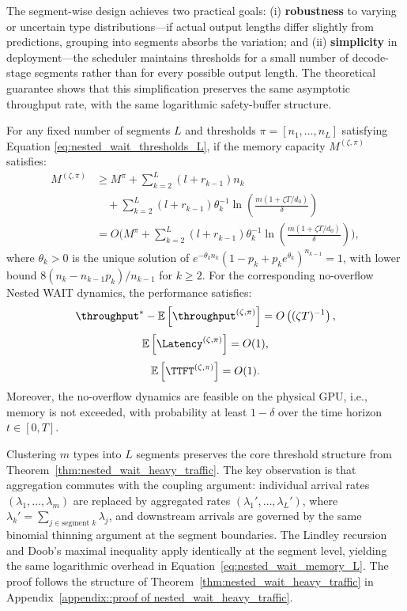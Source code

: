 The segment-wise design achieves two practical goals: (i) \textbf{robustness} to varying or uncertain type distributions---if actual output lengths differ slightly from predictions, grouping into segments absorbs the variation; and (ii) \textbf{simplicity} in deployment---the scheduler maintains thresholds for a small number of decode-stage segments rather than for every possible output length. The theoretical guarantee shows that this simplification preserves the same asymptotic throughput rate, with the same logarithmic safety-buffer structure.

\begin{theorem}
\label{thm:nested_wait_heavy_traffic, any segment}
For any fixed number of segments $L$ and thresholds $\pi = [n_1, \dots, n_L]$ satisfying Equation \eqref{eq:nested_wait_thresholds_L}, if the memory capacity $M^{(\zeta, \pi)}$ satisfies:
\begin{equation}
    \label{eq:nested_wait_memory_L}
    \begin{aligned}
M^{(\zeta, \pi)}
&\geq M^\pi
	+ \sum_{k=2}^L (l + r_{k-1}) n_k \\
&\quad
+ \sum_{k=2}^L (l + r_{k-1}) \theta_k^{-1}
\ln\left( \frac{m(1+\zeta T/d_0)}{\delta} \right) \\
&= O\biggl( M^\pi
+ \sum_{k=2}^L (l + r_{k-1}) \theta_k^{-1}
\ln\left( \frac{m(1+\zeta T/d_0)}{\delta} \right) \biggr),
    \end{aligned}
\end{equation}
where $\theta_k>0$ is the unique solution of \(e^{-\theta_k n_k}(1-p_k+p_ke^{\theta_k})^{n_{k-1}}=1\), with lower bound $8(n_k-n_{k-1}p_k)/n_{k-1}$ for \(k\ge2\).
For the corresponding no-overflow Nested WAIT dynamics, the performance satisfies:
$$\throughput^* - \mathbb{E}\left[ \throughput^{(\zeta, \pi)} \right] = O\left( (\zeta T)^{-1} \right),$$
$$\mathbb{E}\left[ \Latency^{(\zeta, \pi)} \right] = O(1),$$
$$\mathbb{E}\left[ \TTFT^{(\zeta, \pi)} \right] = O(1).$$
Moreover, the no-overflow dynamics are feasible on the physical GPU, i.e., memory is not exceeded, with probability at least \( 1 - \delta \) over the time horizon \(t \in [0,T]\).
\end{theorem}

Clustering $m$ types into $L$ segments preserves the core threshold structure from Theorem~\ref{thm:nested_wait_heavy_traffic}. The key observation is that aggregation commutes with the coupling argument: individual arrival rates $(\lambda_1, \dots, \lambda_m)$ are replaced by aggregated rates $(\lambda_1', \dots, \lambda_L')$, where $\lambda_k' = \sum_{j \in \text{segment } k} \lambda_j$, and downstream arrivals are governed by the same binomial thinning argument at the segment boundaries. The Lindley recursion and Doob's maximal inequality apply identically at the segment level, yielding the same logarithmic overhead in Equation~\eqref{eq:nested_wait_memory_L}. The proof follows the structure of Theorem~\ref{thm:nested_wait_heavy_traffic} in Appendix~\ref{appendix::proof of nested_wait_heavy_traffic}.

